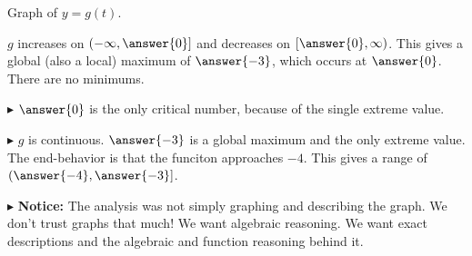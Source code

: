 \documentclass{ximera}
\begin{document}
Graph of $y = g(t)$.



\begin{image}
\end{image}



\begin{conclusion}

$g$ increases on $\left( -\infty, \answer{0} \right]$ and decreases on $\left[ \answer{0}, \infty \right)$.  This gives a global (also a local) maximum of $\answer{-3}$, which occurs at $\answer{0}$.   There are no minimums.


$\blacktriangleright$  $\answer{0}$ is the only critical number, because of the single extreme value.


$\blacktriangleright$  $g$ is continuous.  $\answer{-3}$ is a global maximum and the only extreme value. The end-behavior is that the funciton approaches $-4$. This gives a range of $\left( \answer{-4}, \answer{-3} \right]$.

\end{conclusion}








$\blacktriangleright$ \textbf{\textcolor{red!80!black}{Notice:}}  The analysis was not simply graphing and describing the graph.  We don't trust graphs that much!  We want algebraic reasoning.  We want exact descriptions and the algebraic and function reasoning behind it.
\end{document}
